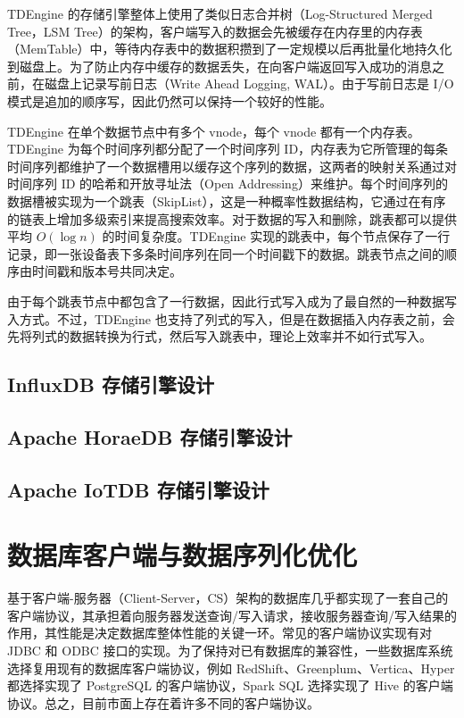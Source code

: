 TDEngine 的存储引擎整体上使用了类似日志合并树（Log-Structured Merged Tree，LSM Tree）\cite{o1996log}的架构，客户端写入的数据会先被缓存在内存里的内存表（MemTable）中，等待内存表中的数据积攒到了一定规模以后再批量化地持久化到磁盘上。为了防止内存中缓存的数据丢失，在向客户端返回写入成功的消息之前，在磁盘上记录写前日志（Write Ahead Logging, WAL）\cite{mohan1992aries}。由于写前日志是 I/O 模式是追加的顺序写，因此仍然可以保持一个较好的性能。

TDEngine 在单个数据节点中有多个 vnode，每个 vnode 都有一个内存表。TDEngine 为每个时间序列都分配了一个时间序列 ID，内存表为它所管理的每条时间序列都维护了一个数据槽用以缓存这个序列的数据，这两者的映射关系通过对时间序列 ID 的哈希和开放寻址法（Open Addressing）来维护。每个时间序列的数据槽被实现为一个跳表（SkipList）\cite{pugh1990skip}，这是一种概率性数据结构，它通过在有序的链表上增加多级索引来提高搜索效率。对于数据的写入和删除，跳表都可以提供平均 $O(\log n)$ 的时间复杂度。TDEngine 实现的跳表中，每个节点保存了一行记录，即一张设备表下多条时间序列在同一个时间戳下的数据。跳表节点之间的顺序由时间戳和版本号共同决定。

由于每个跳表节点中都包含了一行数据，因此行式写入成为了最自然的一种数据写入方式。不过，TDEngine 也支持了列式的写入，但是在数据插入内存表之前，会先将列式的数据转换为行式，然后写入跳表中，理论上效率并不如行式写入。
\subsection{InfluxDB 存储引擎设计}
\subsection{Apache HoraeDB 存储引擎设计}
\subsection{Apache IoTDB 存储引擎设计}
\section{数据库客户端与数据序列化优化\label{sec:chap2-sec3}}
基于客户端-服务器（Client-Server，CS）架构的数据库几乎都实现了一套自己的客户端协议，其承担着向服务器发送查询/写入请求，接收服务器查询/写入结果的作用，其性能是决定数据库整体性能的关键一环。常见的客户端协议实现有对 JDBC\cite{zukowski2006jdbc} 和 ODBC\cite{geiger1995inside} 接口的实现。为了保持对已有数据库的兼容性，一些数据库系统选择复用现有的数据库客户端协议，例如 RedShift\cite{gupta2015amazon}、Greenplum\cite{lyu2021greenplum}、Vertica\cite{lamb2012vertica}、Hyper\cite{neumann2011efficiently} 都选择实现了 PostgreSQL 的客户端协议，Spark SQL\cite{armbrust2015spark} 选择实现了 Hive 的客户端协议。总之，目前市面上存在着许多不同的客户端协议。

